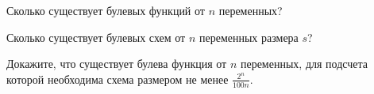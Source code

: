 \begin{enumcyr}
    \item Сколько существует булевых функций от $n$ переменных?
    \item Сколько существует булевых схем от $n$ переменных размера $s$?
    \item Докажите, что существует булева функция от $n$ переменных, для подсчета которой необходима
        схема размером не менее $\frac{2^n}{100n}$.
\end{enumcyr}